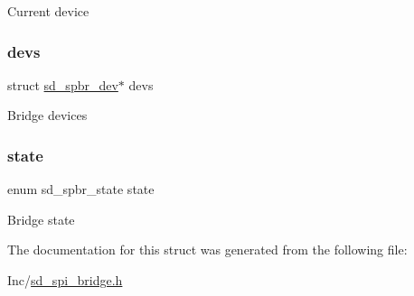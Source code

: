 Current device \mbox{\label{structsd__spbr_a621336d053dd14aaf9eb00348cfc8de0}} 
\subsubsection{\texorpdfstring{devs}{devs}}
{\footnotesize\ttfamily struct \mbox{\hyperlink{structsd__spbr__dev}{sd\+\_\+spbr\+\_\+dev}}$\ast$ devs}

Bridge devices \mbox{\label{structsd__spbr_a15ddc1ec640d62f5f08410710d83de8a}} 
\subsubsection{\texorpdfstring{state}{state}}
{\footnotesize\ttfamily enum sd\+\_\+spbr\+\_\+state state}

Bridge state 

The documentation for this struct was generated from the following file\+:\begin{DoxyCompactItemize}
\item 
Inc/\mbox{\hyperlink{sd__spi__bridge_8h}{sd\+\_\+spi\+\_\+bridge.\+h}}\end{DoxyCompactItemize}
